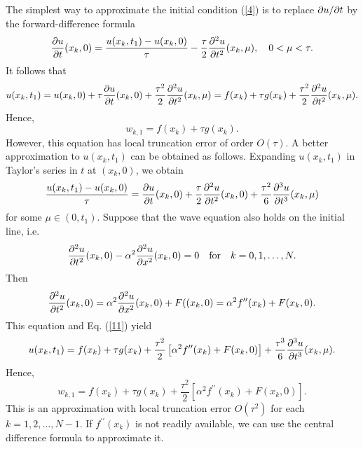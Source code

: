 The simplest way to approximate the initial
condition (\ref{4}) is to replace ${\partial} u/{\partial} t$ by the
forward-difference formula
\[
\frac{{\partial} u}{{\partial}
t}(x_{k},0)=\frac{u(x_{k},t_{1})-u(x_{k},0)}{\tau}-
\frac{\tau}{2}\frac{{\partial}^{2} u}{{\partial} t^{2}}(x_{k}, \mu), \quad 0<\mu
< \tau.
\]
It follows that
\[
u(x_{k},t_{1})=u(x_{k},0)+\tau \frac{{\partial} u}{{\partial} t}(x_{k},0)+
\frac{\tau^{2}}{2}\frac{{\partial}^{2} u}{{\partial} t^{2}}(x_{k}, \mu)=
f(x_{k})+\tau g(x_{k})+ \frac{\tau^{2}}{2}\frac{{\partial}^{2} u}{{\partial}
t^{2}}(x_{k}, \mu).
\]
Hence,
\begin{equation}
w_{k,1}=f(x_{k})+\tau g(x_{k}). \label{10}
\end{equation}
However, this equation has local truncation error of order
$O(\tau)$. A better approximation to $u(x_{k},t_{1})$ can be
obtained as follows. Expanding $u(x_{k},t_{1})$ in Taylor's series
in $t$ at $(x_{k},0)$, we obtain
\begin{equation}
\frac{u(x_{k},t_{1})-u(x_{k},0)}{\tau}=\frac{{\partial} u}{{\partial}
t}(x_{k},0)+ \frac{\tau}{2}\frac{{\partial}^{2} u}{{\partial} t^{2}}(x_{k},0)+
\frac{\tau^{2}}{6}\frac{{\partial}^{3} u}{{\partial} t^{3}}(x_{k}, \mu)
\label{11}
\end{equation}
for some $\mu\in(0,t_{1})$. Suppose that the wave equation also
holds on the initial line, i.e.
\[
\frac{{\partial}^{2} u}{{\partial} t^{2}}(x_{k},0) - \alpha^{2}\frac{{\partial}^{2}
u}{{\partial} x^{2}}(x_{k},0)=0 \quad \hbox{for} \quad k=0,1, \dots, N.
\]
Then
\[
\frac{{\partial}^{2} u}{{\partial} t^{2}}(x_{k},0) = \alpha^{2}\frac{{\partial}^{2}
u}{{\partial} x^{2}}(x_{k},0)+F((x_{k},0)=
\alpha^{2}f^{\prime\prime}(x_{k})+F(x_{k},0).
\]
This equation and Eq. (\ref{11}) yield
\[
u(x_{k},t_{1})=f(x_{k})+\tau g(x_{k})+
\frac{\tau^{2}}{2}\left[\alpha^{2}f^{\prime\prime}(x_{k})+F(x_{k},0)\right]+
\frac{\tau^{3}}{6}\frac{{\partial}^{3} u}{{\partial} t^{3}}(x_{k}, \mu).
\]
Hence,
\begin{equation}
w_{k,1}=f(x_{k})+\tau g(x_{k})+
\frac{\tau^{2}}{2}\left[\alpha^{2}f^{\prime\prime}(x_{k})+F(x_{k},0)\right].
\label{12}
\end{equation}
This is an approximation with local truncation error $O(\tau^{2})$
for each $k=1, 2, \dots, N-1$. If $f^{\prime\prime}(x_{k})$ is not
readily available, we can use the central difference formula to
approximate it.


